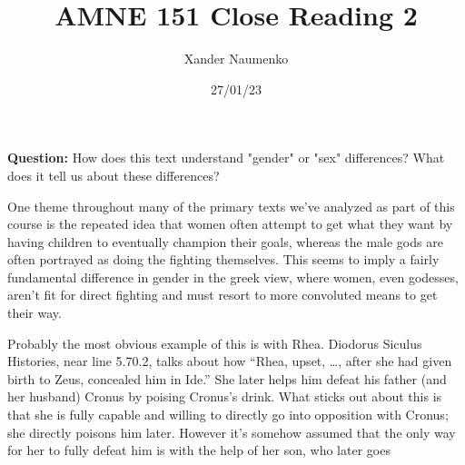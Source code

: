 \documentclass[letterpaper, reqno,11pt]{article}
\begin{document}
\title{AMNE 151 Close Reading 2}
\date{27/01/23}
\author{Xander Naumenko}
\maketitle

{\bf Question:} How does this text understand "gender" or "sex" differences? What does it tell us about these differences? 

One theme throughout many of the primary texts we've analyzed as part of this course is the repeated idea that women often attempt to get what they want by having children to eventually champion their goals, whereas the male gods are often portrayed as doing the fighting themselves. This seems to imply a fairly fundamental difference in gender in the greek view, where women, even godesses, aren't fit for direct fighting and must resort to more convoluted means to get their way. 

Probably the most obvious example of this is with Rhea. Diodorus Siculus Histories, near line 5.70.2, talks about how ``Rhea, upset, \ldots, after she had given birth to Zeus, concealed him in Ide.'' She later helps him defeat his father (and her husband) Cronus by poising Cronus's drink. What sticks out about this is that she is fully capable and willing to directly go into opposition with Cronus; she directly poisons him later. However it's somehow assumed that the only way for her to fully defeat him is with the help of her son, who later goes 
\end{document}
